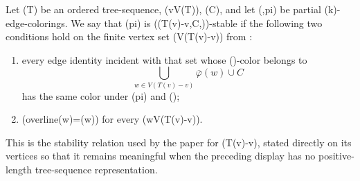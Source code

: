 \begin{definition}
Let (T) be an ordered tree-sequence, (v\in V(T)), (C\subseteq[k]),
and let (\varphi,pi) be partial (k)-edge-colorings.  We say that
(pi) is ((T(v)-v,C,\varphi))-stable if the following two conditions
hold on the finite vertex set (V(T(v)-v)) from
:
\begin{enumerate}
\item every edge identity incident with that set whose (\varphi)-color
belongs to
\[
 \bigcup_{w\in V(T(v)-v)}\overline\varphi(w)\cup C
\]
has the same color under (pi) and (\varphi);
\item (overline\pi(w)=\overline\varphi(w)) for every
(w\in V(T(v)-v)).
\end{enumerate}
This is the stability relation used by the paper for (T(v)-v), stated
directly on its vertices so that it remains meaningful when the preceding
display has no positive-length tree-sequence representation.
\end{definition}

